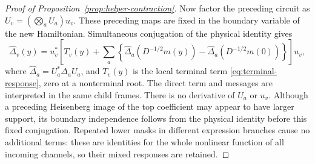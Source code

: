 \begin{proof}[Proof of Proposition~\ref{prop:helper-contraction}]
Now factor the preceding circuit as
\(U_v=(\bigotimes_aU_a)u_v\).  These preceding maps are fixed in
the boundary variable of the new Hamiltonian.  Simultaneous
conjugation of the physical identity gives
\begin{equation}
 \widehat\Delta_v(y)=u_v^*\left[T_v(y)+\sum_a
   \left\{\widehat\Delta_a(D^{-1/2}m(y))
             -\widehat\Delta_a(D^{-1/2}m(0))\right\}\right]u_v,
 \label{eq:conjugated-lower-cut-identity}
\end{equation}
where \(\widehat\Delta_a=U_a^*\Delta_aU_a\), and \(T_v(y)\) is
the local terminal term \eqref{eq:terminal-response}, zero at a
nonterminal root. The direct term and messages are interpreted in
the same child frames.  There is no
derivative of \(U_a\) or \(u_v\).  Although a preceding Heisenberg
image of the top coefficient may appear to have larger support, its
boundary independence follows from the physical identity before
this fixed conjugation.  Repeated lower masks in different expression
branches cause no additional terms: these are identities for the
whole nonlinear function of all incoming channels, so their mixed
responses are retained.


\end{proof}
